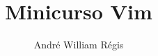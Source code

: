 \documentclass{beamer}
\title{Minicurso Vim}
\author{André William Régis}
\institute{UFSC}
\date{\the\year}
\begin{document}
\frame{\titlepage}








\end{document}
